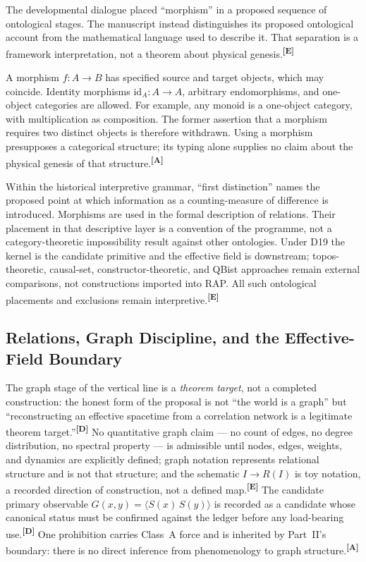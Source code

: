 \documentclass[12pt,a4paper,twoside]{article}
\theoremstyle{plain}
\theoremstyle{definition}
\theoremstyle{remark}
\newcommand{\catmark}[1]{\textsuperscript{\textsf{\textbf{[#1]}}}}
\begin{document}
The developmental dialogue placed ``morphism'' in a proposed sequence of
ontological stages. The manuscript instead distinguishes its proposed
ontological account from the mathematical language used to describe it.
That separation is a framework interpretation, not a theorem about physical
genesis.\catmark{E}

A morphism $f\colon A\to B$ has specified source and target objects, which
may coincide. Identity morphisms $\mathrm{id}_A\colon A\to A$, arbitrary
endomorphisms, and one-object categories are allowed. For example, any monoid
is a one-object category, with multiplication as composition. The former
assertion that a morphism requires two distinct objects is therefore
withdrawn. Using a morphism presupposes a categorical structure; its typing
alone supplies no claim about the physical genesis of that structure.\catmark{A}

Within the historical interpretive grammar, ``first distinction'' names the
proposed point at which information as a counting-measure of difference is
introduced. Morphisms are used in the formal description of relations.
Their placement in that descriptive layer is a convention of the programme,
not a category-theoretic impossibility result against other ontologies.
Under D19 the kernel is the candidate primitive and the effective field is
downstream; topos-theoretic, causal-set, constructor-theoretic, and QBist
approaches remain external comparisons, not constructions imported into RAP.
All such ontological placements and exclusions remain interpretive.\catmark{E}

\subsection{Relations, Graph Discipline, and the Effective-Field Boundary}
\label{subsec:coarse-geometry-eft}

The graph stage of the vertical line is a \emph{theorem target}, not a
completed construction: the honest form of the proposal is not ``the
world is a graph'' but ``reconstructing an effective spacetime from a
correlation network is a legitimate theorem target.''\catmark{D} No
quantitative graph claim --- no count of edges, no degree distribution,
no spectral property --- is admissible until nodes, edges, weights, and
dynamics are explicitly defined; graph notation represents relational
structure and is not that structure; and the schematic $I \to R(I)$ is
toy notation, a recorded direction of construction, not a defined
map.\catmark{E} The candidate primary observable
$G(x,y) = \langle S(x)\,S(y)\rangle$ is recorded as a candidate whose
canonical status must be confirmed against the ledger before any
load-bearing use.\catmark{D} One prohibition carries Class~A force and
is inherited by Part~II's boundary: there is no direct inference from
phenomenology to graph structure.\catmark{A}
\end{document}
